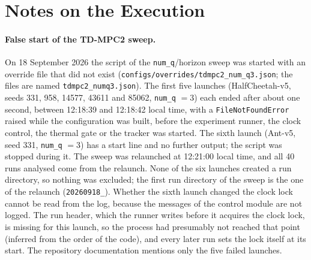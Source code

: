 \section{Notes on the Execution}\label{sec:app-repro-notes}

\paragraph{False start of the TD-MPC2 sweep.} On 18 September 2026 the script of the \texttt{num\_\allowbreak q}/horizon sweep was started with an override file that did not exist (\texttt{configs/\allowbreak overrides/\allowbreak tdmpc2\_\allowbreak num\_\allowbreak q3.json}; the files are named \texttt{tdmpc2\_\allowbreak numq3.json}).
The first five launches (HalfCheetah-v5, seeds \num{331}, \num{958}, \num{14577}, \num{43611} and \num{85062}, \texttt{num\_\allowbreak q} $=3$) each ended after about one second, between 12:18:39 and 12:18:42 local time, with a \texttt{FileNotFoundError} raised while the configuration was built, before the experiment runner, the clock control, the thermal gate or the tracker was started.
The sixth launch (Ant-v5, seed \num{331}, \texttt{num\_\allowbreak q} $=3$) has a start line and no further output; the script was stopped during it.
The sweep was relaunched at 12:21:00 local time, and all \num{40} runs analysed come from the relaunch.
None of the six launches created a run directory, so nothing was excluded; the first run directory of the sweep is the one of the relaunch (\texttt{20260918\_}).
Whether the sixth launch changed the clock lock cannot be read from the log, because the messages of the control module are not logged.
The run header, which the runner writes before it acquires the clock lock, is missing for this launch, so the process had presumably not reached that point (inferred from the order of the code), and every later run sets the lock itself at its start.
The repository documentation mentions only the five failed launches.

